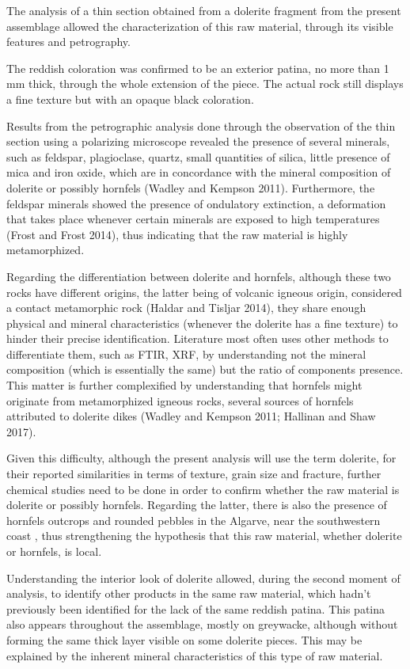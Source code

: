 \documentclass[12pt,twoside]{reedthesis}
\begin{document}
The analysis of a thin section obtained from a dolerite fragment from the present assemblage allowed the characterization of this raw material, through its visible features and petrography.

The reddish coloration was confirmed to be an exterior patina, no more than 1 mm thick, through the whole extension of the piece. The actual rock still displays a fine texture but with an opaque black coloration.

Results from the petrographic analysis done through the observation of the thin section using a polarizing microscope revealed the presence of several minerals, such as feldspar, plagioclase, quartz, small quantities of silica, little presence of mica and iron oxide, which are in concordance with the mineral composition of dolerite or possibly hornfels (Wadley and Kempson 2011). Furthermore, the feldspar minerals showed the presence of ondulatory extinction, a deformation that takes place whenever certain minerals are exposed to high temperatures (Frost and Frost 2014), thus indicating that the raw material is highly metamorphized.

Regarding the differentiation between dolerite and hornfels, although these two rocks have different origins, the latter being of volcanic igneous origin, considered a contact metamorphic rock (Haldar and Tisljar 2014), they share enough physical and mineral characteristics (whenever the dolerite has a fine texture) to hinder their precise identification. Literature most often uses other methods to differentiate them, such as FTIR, XRF, by understanding not the mineral composition (which is essentially the same) but the ratio of components presence. This matter is further complexified by understanding that hornfels might originate from metamorphized igneous rocks, several sources of hornfels attributed to dolerite dikes (Wadley and Kempson 2011; Hallinan and Shaw 2017).

Given this difficulty, although the present analysis will use the term dolerite, for their reported similarities in terms of texture, grain size and fracture, further chemical studies need to be done in order to confirm whether the raw material is dolerite or possibly hornfels. Regarding the latter, there is also the presence of hornfels outcrops and rounded pebbles in the Algarve, near the southwestern coast , thus strengthening the hypothesis that this raw material, whether dolerite or hornfels, is local.

Understanding the interior look of dolerite allowed, during the second moment of analysis, to identify other products in the same raw material, which hadn't previously been identified for the lack of the same reddish patina. This patina also appears throughout the assemblage, mostly on greywacke, although without forming the same thick layer visible on some dolerite pieces. This may be explained by the inherent mineral characteristics of this type of raw material.
\end{document}

